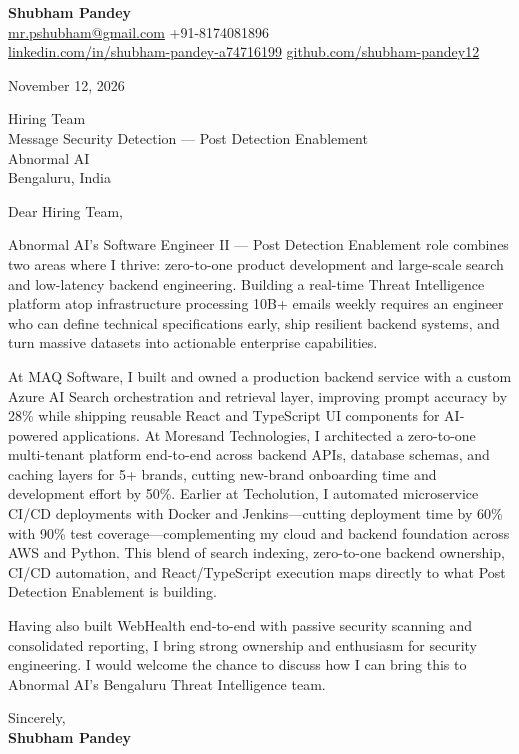 \documentclass[a4paper,11pt]{article}
\begin{document}
\textbf{\Large Shubham Pandey}\\
\href{mailto:mr.pshubham@gmail.com}{mr.pshubham@gmail.com} \quad +91-8174081896\\
\href{https://www.linkedin.com/in/shubham-pandey-a74716199/}{linkedin.com/in/shubham-pandey-a74716199} \quad
\href{https://github.com/shubham-pandey12}{github.com/shubham-pandey12}

\vspace{1em}
November 12, 2026

\vspace{1em}
Hiring Team\\
Message Security Detection --- Post Detection Enablement\\
Abnormal AI\\
Bengaluru, India

\vspace{1em}
Dear Hiring Team,

Abnormal AI's Software Engineer II --- Post Detection Enablement role combines two areas where I thrive: zero-to-one product development and large-scale search and low-latency backend engineering. Building a real-time Threat Intelligence platform atop infrastructure processing 10B+ emails weekly requires an engineer who can define technical specifications early, ship resilient backend systems, and turn massive datasets into actionable enterprise capabilities.

At MAQ Software, I built and owned a production backend service with a custom Azure AI Search orchestration and retrieval layer, improving prompt accuracy by 28\% while shipping reusable React and TypeScript UI components for AI-powered applications. At Moresand Technologies, I architected a zero-to-one multi-tenant platform end-to-end across backend APIs, database schemas, and caching layers for 5+ brands, cutting new-brand onboarding time and development effort by 50\%. Earlier at Techolution, I automated microservice CI/CD deployments with Docker and Jenkins---cutting deployment time by 60\% with 90\% test coverage---complementing my cloud and backend foundation across AWS and Python. This blend of search indexing, zero-to-one backend ownership, CI/CD automation, and React/TypeScript execution maps directly to what Post Detection Enablement is building.

Having also built WebHealth end-to-end with passive security scanning and consolidated reporting, I bring strong ownership and enthusiasm for security engineering. I would welcome the chance to discuss how I can bring this to Abnormal AI's Bengaluru Threat Intelligence team.

\vspace{1em}
Sincerely,\\[0.5em]
\textbf{Shubham Pandey}
\end{document}

